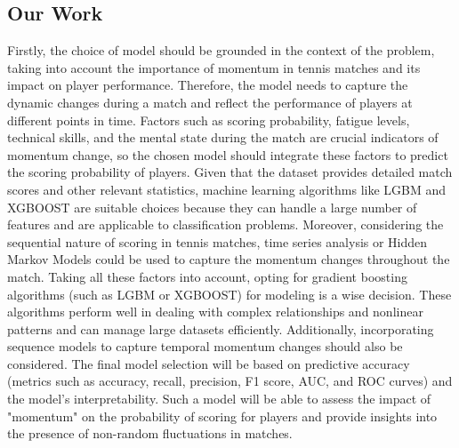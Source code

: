 \documentclass{article}
\begin{document}
\subsection{Our Work}
Firstly, the choice of model should be grounded in the context of the problem, taking into account the importance of momentum in tennis matches and its impact on player performance. Therefore, the model needs to capture the dynamic changes during a match and reflect the performance of players at different points in time. Factors such as scoring probability, fatigue levels, technical skills, and the mental state during the match are crucial indicators of momentum change, so the chosen model should integrate these factors to predict the scoring probability of players. Given that the dataset provides detailed match scores and other relevant statistics, machine learning algorithms like LGBM and XGBOOST are suitable choices because they can handle a large number of features and are applicable to classification problems. Moreover, considering the sequential nature of scoring in tennis matches, time series analysis or Hidden Markov Models could be used to capture the momentum changes throughout the match.
Taking all these factors into account, opting for gradient boosting algorithms (such as LGBM or XGBOOST) for modeling is a wise decision. These algorithms perform well in dealing with complex relationships and nonlinear patterns and can manage large datasets efficiently. Additionally, incorporating sequence models to capture temporal momentum changes should also be considered. The final model selection will be based on predictive accuracy (metrics such as accuracy, recall, precision, F1 score, AUC, and ROC curves) and the model's interpretability. Such a model will be able to assess the impact of "momentum" on the probability of scoring for players and provide insights into the presence of non-random fluctuations in matches.
\end{document}

